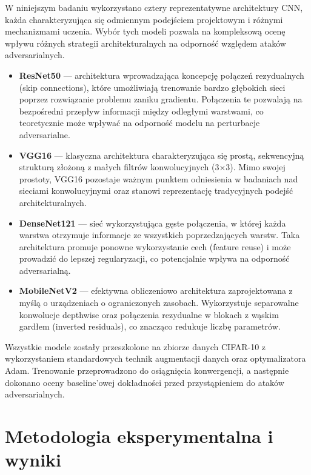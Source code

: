 \documentclass[12pt]{article}
\begin{document}
W niniejszym badaniu wykorzystano cztery reprezentatywne architektury CNN, każda charakteryzująca się odmiennym podejściem projektowym i różnymi mechanizmami uczenia. Wybór tych modeli pozwala na kompleksową ocenę wpływu różnych strategii architekturalnych na odporność względem ataków adversarialnych.

\begin{itemize}
    \item \textbf{ResNet50} \cite{he2016deep} --- architektura wprowadzająca koncepcję połączeń rezydualnych (skip connections), które umożliwiają trenowanie bardzo głębokich sieci poprzez rozwiązanie problemu zaniku gradientu. Połączenia te pozwalają na bezpośredni przepływ informacji między odległymi warstwami, co teoretycznie może wpływać na odporność modelu na perturbacje adversarialne.
    
    \item \textbf{VGG16} \cite{simonyan2014very} --- klasyczna architektura charakteryzująca się prostą, sekwencyjną strukturą złożoną z małych filtrów konwolucyjnych (3×3). Mimo swojej prostoty, VGG16 pozostaje ważnym punktem odniesienia w badaniach nad sieciami konwolucyjnymi oraz stanowi reprezentację tradycyjnych podejść architekturalnych.
    
    \item \textbf{DenseNet121} \cite{huang2017densely} --- sieć wykorzystująca gęste połączenia, w której każda warstwa otrzymuje informacje ze wszystkich poprzedzających warstw. Taka architektura promuje ponowne wykorzystanie cech (feature reuse) i może prowadzić do lepszej regularyzacji, co potencjalnie wpływa na odporność adversarialną.
    
    \item \textbf{MobileNetV2} \cite{sandler2018mobilenetv2} --- efektywna obliczeniowo architektura zaprojektowana z myślą o urządzeniach o ograniczonych zasobach. Wykorzystuje separowalne konwolucje depthwise oraz połączenia rezydualne w blokach z wąskim gardłem (inverted residuals), co znacząco redukuje liczbę parametrów.
\end{itemize}

Wszystkie modele zostały przeszkolone na zbiorze danych CIFAR-10 z wykorzystaniem standardowych technik augmentacji danych oraz optymalizatora Adam. Trenowanie przeprowadzono do osiągnięcia konwergencji, a następnie dokonano oceny baseline'owej dokładności przed przystąpieniem do ataków adversarialnych.

\section{Metodologia eksperymentalna i wyniki}
\end{document}
